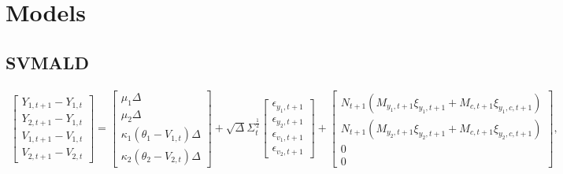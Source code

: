 \documentclass{article}
\begin{document}


\section{Models}

\subsection{SVMALD}

\begin{align}
    \begin{bmatrix} Y_{1,t + 1} - Y_{1,t} \\ Y_{2,t + 1} - Y_{1,t} \\ V_{1,t + 1} - V_{1,t} \\ V_{2,t + 1} - V_{2,t} \end{bmatrix} = \begin{bmatrix} \mu_1 \Delta \\ \mu_2 \Delta \\ \kappa_1(\theta_1 - V_{1,t}) \Delta \\ \kappa_2(\theta_2 - V_{2,t}) \Delta \end{bmatrix} + \sqrt{\Delta}\Sigma_t^{\frac{1}{2}} \begin{bmatrix} \epsilon_{y_1,t+1} \\ \epsilon_{y_2,t+1} \\ \epsilon_{v_1,t+1} \\ \epsilon_{v_2,t+1} \end{bmatrix} + \begin{bmatrix} N_{t+1}(M_{y_1,t+1} \xi_{y_1, t+1} + M_{c,t+1} \xi_{y_1,c,t+1}) \\ N_{t+1}(M_{y_2,t+1} \xi_{y_2, t+1} + M_{c,t+1} \xi_{y_2,c,t+1}) \\ 0 \\ 0 \end{bmatrix}, \label{S_tdisc_2d}
\end{align}
\end{document}
